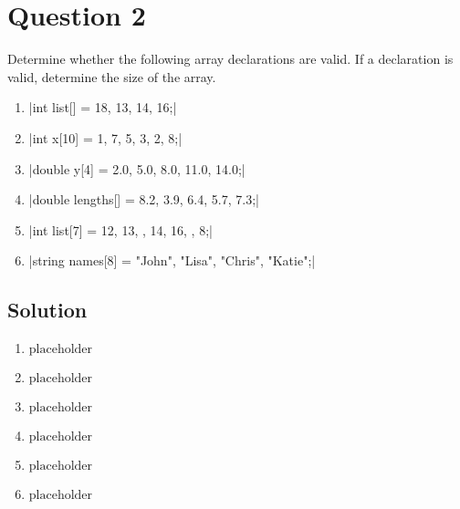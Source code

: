 \documentclass[a4paper, 11pt]{article}
\begin{document}
  \section{Question 2}
    Determine whether the following array declarations are valid. If a declaration 
      is valid, determine the size of the array.

    \begin{enumerate}[label=\Alph*.]
      \item |int list[] = {18, 13, 14, 16};|
      \item |int x[10] = {1, 7, 5, 3, 2, 8};|
      \item |double y[4] = { 2.0, 5.0, 8.0, 11.0, 14.0};|
      \item |double lengths[] = { 8.2, 3.9, 6.4, 5.7, 7.3};|
      \item |int list[7] = {12, 13, , 14, 16, , 8};|
      \item |string names[8] = {"John", "Lisa", "Chris", "Katie"};|
    \end{enumerate}

    \subsection{Solution}
      \begin{enumerate}[label=\alph*.]
        \item \begin{mdframed}[style=AnswerFrame]
          $\text{placeholder}$
          \end{mdframed}
        \item \begin{mdframed}[style=AnswerFrame]
          $\text{placeholder}$
          \end{mdframed}
        \item \begin{mdframed}[style=AnswerFrame]
          $\text{placeholder}$
          \end{mdframed}
        \item \begin{mdframed}[style=AnswerFrame]
          $\text{placeholder}$
          \end{mdframed}
        \item \begin{mdframed}[style=AnswerFrame]
          $\text{placeholder}$
          \end{mdframed}
        \item \begin{mdframed}[style=AnswerFrame]
          $\text{placeholder}$
          \end{mdframed}
      \end{enumerate}
\end{document}
